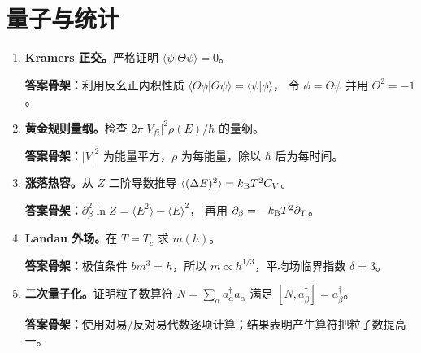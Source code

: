 \section{量子与统计}
\begin{enumerate}
\item \textbf{Kramers 正交。}严格证明
$\langle\psi|\Theta\psi\rangle=0$。

\textbf{答案骨架：}利用反幺正内积性质
$\langle\Theta\phi|\Theta\psi\rangle=\langle\psi|\phi\rangle$，
令 $\phi=\Theta\psi$ 并用 $\Theta^2=-1$。

\item \textbf{黄金规则量纲。}检查
$2\pi|V_{fi}|^2\rho(E)/\hbar$ 的量纲。

\textbf{答案骨架：}$|V|^2$ 为能量平方，$\rho$ 为每能量，除以
$\hbar$ 后为每时间。

\item \textbf{涨落热容。}从 $Z$ 二阶导数推导
$\langle(\Delta E)^2\rangle=k_{\mathrm B} T^2C_V$。

\textbf{答案骨架：}$\partial_\beta^2\ln Z=\langle E^2\rangle-\langle E\rangle^2$，
再用 $\partial_\beta=-k_{\mathrm B} T^2\partial_T$。

\item \textbf{Landau 外场。}在 $T=T_c$ 求 $m(h)$。

\textbf{答案骨架：}极值条件 $bm^3=h$，所以
$m\propto h^{1/3}$，平均场临界指数 $\delta=3$。

\item \textbf{二次量子化。}证明粒子数算符
$N=\sum_\alpha a_\alpha^\dagger a_\alpha$ 满足
$[N,a_\beta^\dagger]=a_\beta^\dagger$。

\textbf{答案骨架：}使用对易/反对易代数逐项计算；结果表明产生算符把粒子数提高一。
\end{enumerate}

